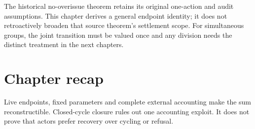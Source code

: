 The historical no-overissue theorem retains its original one-action and
audit assumptions. This chapter derives a general endpoint identity; it
does not retroactively broaden that source theorem's settlement scope.
For simultaneous groups, the joint transition must be valued once and any
division needs the distinct treatment in the next chapters.

\section*{Chapter recap}
Live endpoints, fixed parameters and complete external accounting make the
sum reconstructible. Closed-cycle closure rules out one accounting exploit.
It does not prove that actors prefer recovery over cycling or refusal.
